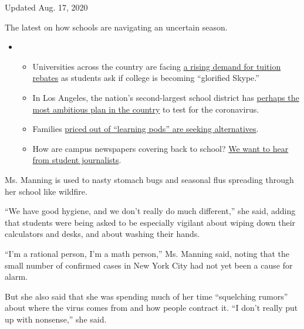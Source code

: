 Updated Aug. 17, 2020

The latest on how schools are navigating an uncertain season.

\begin{itemize}
\item
  \begin{itemize}
  \tightlist
  \item
    Universities across the country are facing
    \href{https://www.nytimes3xbfgragh.onion/2020/08/15/us/covid-college-tuition.html?action=click\&pgtype=Article\&state=default\&region=MAIN_CONTENT_3\&context=storylines_keepup}{a
    rising demand for tuition rebates} as students ask if college is
    becoming ``glorified Skype.''
  \item
    In Los Angeles, the nation's second-largest school district has
    \href{https://www.nytimes3xbfgragh.onion/2020/08/16/us/los-angeles-schools-virus-testing.html?action=click\&pgtype=Article\&state=default\&region=MAIN_CONTENT_3\&context=storylines_keepup}{perhaps
    the most ambitious plan in the country} to test for the coronavirus.
  \item
    Families
    \href{https://www.nytimes3xbfgragh.onion/2020/08/14/us/covid-schools-learning-pods.html?action=click\&pgtype=Article\&state=default\&region=MAIN_CONTENT_3\&context=storylines_keepup}{priced
    out of ``learning pods'' are seeking alternatives}.
  \item
    How are campus newspapers covering back to school?
    \href{https://www.nytimes3xbfgragh.onion/2020/08/17/us/student-newspaper-schools-reopening.html?action=click\&pgtype=Article\&state=default\&region=MAIN_CONTENT_3\&context=storylines_keepup}{We
    want to hear from student journalists}.
  \end{itemize}
\end{itemize}

Ms. Manning is used to nasty stomach bugs and seasonal flus spreading
through her school like wildfire.

``We have good hygiene, and we don't really do much different,'' she
said, adding that students were being asked to be especially vigilant
about wiping down their calculators and desks, and about washing their
hands.

``I'm a rational person, I'm a math person,'' Ms. Manning said, noting
that the small number of confirmed cases in New York City had not yet
been a cause for alarm.

But she also said that she was spending much of her time ``squelching
rumors'' about where the virus comes from and how people contract it.
``I don't really put up with nonsense,'' she said.

